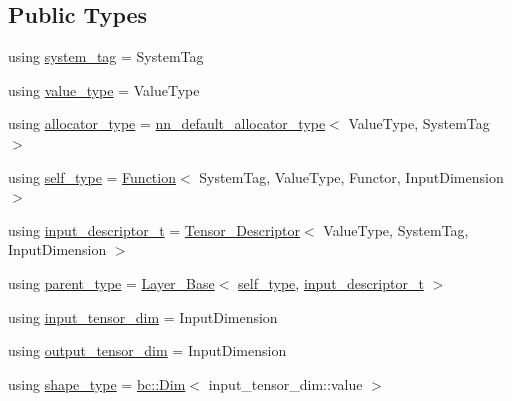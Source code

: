 \subsection*{Public Types}
\begin{DoxyCompactItemize}
\item 
using \hyperlink{structbc_1_1nn_1_1Function_a7882db6732a438adaa9724bd80f57c13}{system\+\_\+tag} = System\+Tag
\item 
using \hyperlink{structbc_1_1nn_1_1Function_a960ffb695c734f905e72c911ee6f8b88}{value\+\_\+type} = Value\+Type
\item 
using \hyperlink{structbc_1_1nn_1_1Function_aeb0024acff31772fe200f6c609b17ff4}{allocator\+\_\+type} = \hyperlink{namespacebc_1_1nn_a0025752fc3f47f988b3fae106c825860}{nn\+\_\+default\+\_\+allocator\+\_\+type}$<$ Value\+Type, System\+Tag $>$
\item 
using \hyperlink{structbc_1_1nn_1_1Function_adece619f4fd89384525c9a38bfbb6446}{self\+\_\+type} = \hyperlink{structbc_1_1nn_1_1Function}{Function}$<$ System\+Tag, Value\+Type, Functor, Input\+Dimension $>$
\item 
using \hyperlink{structbc_1_1nn_1_1Function_a4851b2a44e4e723b04bc0fa85b5230e7}{input\+\_\+descriptor\+\_\+t} = \hyperlink{structbc_1_1nn_1_1Tensor__Descriptor}{Tensor\+\_\+\+Descriptor}$<$ Value\+Type, System\+Tag, Input\+Dimension $>$
\item 
using \hyperlink{structbc_1_1nn_1_1Function_aac15eb912eb37278467558226f71fe65}{parent\+\_\+type} = \hyperlink{structbc_1_1nn_1_1Layer__Base}{Layer\+\_\+\+Base}$<$ \hyperlink{structbc_1_1nn_1_1Function_adece619f4fd89384525c9a38bfbb6446}{self\+\_\+type}, \hyperlink{structbc_1_1nn_1_1Function_a4851b2a44e4e723b04bc0fa85b5230e7}{input\+\_\+descriptor\+\_\+t} $>$
\item 
using \hyperlink{structbc_1_1nn_1_1Function_a77caf4997c1a02816179a2c3773f487e}{input\+\_\+tensor\+\_\+dim} = Input\+Dimension
\item 
using \hyperlink{structbc_1_1nn_1_1Function_ab3450a09e41881b85f3f37112245b4f4}{output\+\_\+tensor\+\_\+dim} = Input\+Dimension
\item 
using \hyperlink{structbc_1_1nn_1_1Function_ab8cbdaad20a0270b2555a91676a79932}{shape\+\_\+type} = \hyperlink{structbc_1_1Dim}{bc\+::\+Dim}$<$ input\+\_\+tensor\+\_\+dim\+::value $>$
\end{DoxyCompactItemize}
